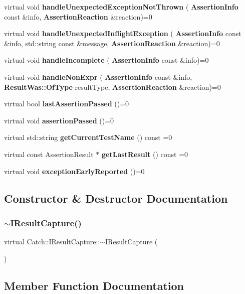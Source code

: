 \begin{DoxyCompactItemize}
\item 
virtual void \textbf{ handle\+Unexpected\+Exception\+Not\+Thrown} (\textbf{ Assertion\+Info} const \&info, \textbf{ Assertion\+Reaction} \&reaction)=0
\item 
virtual void \textbf{ handle\+Unexpected\+Inflight\+Exception} (\textbf{ Assertion\+Info} const \&info, std\+::string const \&message, \textbf{ Assertion\+Reaction} \&reaction)=0
\item 
virtual void \textbf{ handle\+Incomplete} (\textbf{ Assertion\+Info} const \&info)=0
\item 
virtual void \textbf{ handle\+Non\+Expr} (\textbf{ Assertion\+Info} const \&info, \textbf{ Result\+Was\+::\+Of\+Type} result\+Type, \textbf{ Assertion\+Reaction} \&reaction)=0
\item 
virtual bool \textbf{ last\+Assertion\+Passed} ()=0
\item 
virtual void \textbf{ assertion\+Passed} ()=0
\item 
virtual std\+::string \textbf{ get\+Current\+Test\+Name} () const =0
\item 
virtual const Assertion\+Result $\ast$ \textbf{ get\+Last\+Result} () const =0
\item 
virtual void \textbf{ exception\+Early\+Reported} ()=0
\end{DoxyCompactItemize}


\subsection{Constructor \& Destructor Documentation}
\mbox{\label{struct_catch_1_1_i_result_capture_a3bd16719d6772b7470887fc36c6d0808}} 
\subsubsection{$\sim$IResultCapture()}
{\footnotesize\ttfamily virtual Catch\+::\+I\+Result\+Capture\+::$\sim$\+I\+Result\+Capture (\begin{DoxyParamCaption}{ }\end{DoxyParamCaption})\hspace{0.3cm}{\ttfamily [virtual]}}



\subsection{Member Function Documentation}
\mbox{\label{struct_catch_1_1_i_result_capture_ab020d111e29ad1cabe1227dcfda712ef}} 
